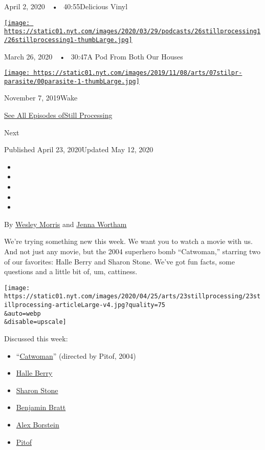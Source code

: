 April 2, 2020~~•~ 40:55Delicious Vinyl

\href{https://www.nytimes.com/2020/03/26/podcasts/still-processing-quarantine.html?action=click\&module=audio-series-bar\&region=header\&pgtype=Article}{\texttt{[image: https://static01.nyt.com/images/2020/03/29/podcasts/26stillprocessing1/26stillprocessing1-thumbLarge.jpg]}}

March 26, 2020~~•~ 30:47A Pod From Both Our Houses

\href{https://www.nytimes.com/2019/11/07/podcasts/still-processing-parasite-watchmen-bong-joon-ho.html?action=click\&module=audio-series-bar\&region=header\&pgtype=Article}{\texttt{[image: https://static01.nyt.com/images/2019/11/08/arts/07stilpr-parasite/00parasite-1-thumbLarge.jpg]}}

November 7, 2019Wake

\href{https://www.nytimes.com/column/still-processing-podcast}{See All
Episodes ofStill Processing}

Next

Published April 23, 2020Updated May 12, 2020

\begin{itemize}
\item
\item
\item
\item
\item
\end{itemize}

By \href{https://www.nytimes.com/by/wesley-morris}{Wesley Morris} and
\href{https://www.nytimes.com/by/jenna-wortham}{Jenna Wortham}

We're trying something new this week. We want you to watch a movie with
us. And not just any movie, but the 2004 superhero bomb ``Catwoman,''
starring two of our favorites: Halle Berry and Sharon Stone. We've got
fun facts, some questions and a little bit of, um, cattiness.

\texttt{[image: https://static01.nyt.com/images/2020/04/25/arts/23stillprocessing/23stillprocessing-articleLarge-v4.jpg?quality=75\\\&auto=webp\\\&disable=upscale]}

Discussed this week:

\begin{itemize}
\item
  ``\href{https://www.imdb.com/title/tt0327554/}{Catwoman}'' (directed
  by Pitof, 2004)
\item
  \href{https://www.imdb.com/name/nm0000932/}{Halle Berry}
\item
  \href{https://www.imdb.com/name/nm0000232/}{Sharon Stone}
\item
  \href{https://www.imdb.com/name/nm0000973/}{Benjamin Bratt}
\item
  \href{https://www.imdb.com/name/nm0097504/}{Alex Borstein}
\item
  \href{https://www.imdb.com/name/nm0685759/}{Pitof}
\end{itemize}

